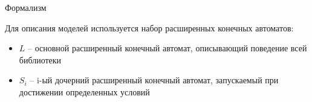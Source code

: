 \documentclass[12pt]{beamer}
\begin{document}
{
\begin{frame}{Формализм}
  \begin{mybox}[]
  Для описания моделей используется набор расширенных конечных автоматов:
  \begin{itemize}
  	\item $L$ – основной расширенный конечный автомат, описывающий поведение всей библиотеки
  	\item $S_i$ – i-ый дочерний расширенный конечный автомат, запускаемый при достижении определенных условий
  \end{itemize}
  \end{mybox}
\end{frame}
}
\end{document}
